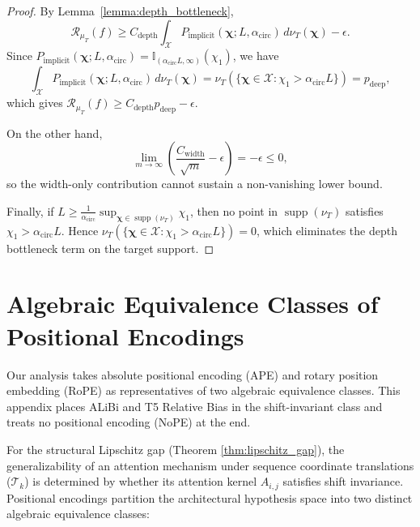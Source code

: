\begin{proof}
By Lemma~\ref{lemma:depth_bottleneck},
\begin{equation}
\mathcal{R}_{\mu_T}(f)
\ge
C_{\mathrm{depth}}
\int_{\mathcal{X}}
P_{\mathrm{implicit}}(\boldsymbol{\chi};L,\alpha_{\mathrm{circ}})
\,d\nu_T(\boldsymbol{\chi})
-\epsilon.
\end{equation}
Since $P_{\mathrm{implicit}}(\boldsymbol{\chi};L,\alpha_{\mathrm{circ}}) = \mathbb{I}_{(\alpha_{\mathrm{circ}}L,\infty)}(\chi_1)$, we have
\begin{equation}
\int_{\mathcal{X}} P_{\mathrm{implicit}}(\boldsymbol{\chi};L,\alpha_{\mathrm{circ}}) \,d\nu_T(\boldsymbol{\chi}) = \nu_T\!( \{\boldsymbol{\chi}\in\mathcal{X}:\chi_1>\alpha_{\mathrm{circ}}L\} ) = p_{\mathrm{deep}},
\end{equation}
which gives $\mathcal{R}_{\mu_T}(f)\ge C_{\mathrm{depth}}p_{\mathrm{deep}}-\epsilon$.

On the other hand,
\begin{equation}
\lim_{m\to\infty} \left( \frac{C_{\mathrm{width}}}{\sqrt m}-\epsilon \right) = -\epsilon \le 0,
\end{equation}
so the width-only contribution cannot sustain a non-vanishing lower bound.

Finally, if $L \ge \frac{1}{\alpha_{\mathrm{circ}}} \sup_{\boldsymbol{\chi}\in\operatorname{supp}(\nu_T)} \chi_1$, then no point in $\operatorname{supp}(\nu_T)$ satisfies $\chi_1>\alpha_{\mathrm{circ}}L$. Hence $\nu_T\!( \{\boldsymbol{\chi}\in\mathcal{X}:\chi_1>\alpha_{\mathrm{circ}}L\} ) = 0$, which eliminates the depth bottleneck term on the target support.
\end{proof}

\section{Algebraic Equivalence Classes of Positional Encodings}
\label{app:pe_equivalence}

Our analysis takes absolute positional encoding (APE) and rotary position embedding (RoPE) as representatives of two algebraic equivalence classes. This appendix places ALiBi \citep{press2022trainshorttestlong} and T5 Relative Bias in the shift-invariant class and treats no positional encoding (NoPE) \citep{kazemnejad2023impactpositionalencodinglength} at the end.

For the structural Lipschitz gap (Theorem \ref{thm:lipschitz_gap}), the generalizability of an attention mechanism under sequence coordinate translations ($\mathcal{T}_k$) is determined by whether its attention kernel $A_{i,j}$ satisfies shift invariance. Positional encodings partition the architectural hypothesis space into two distinct algebraic equivalence classes:

